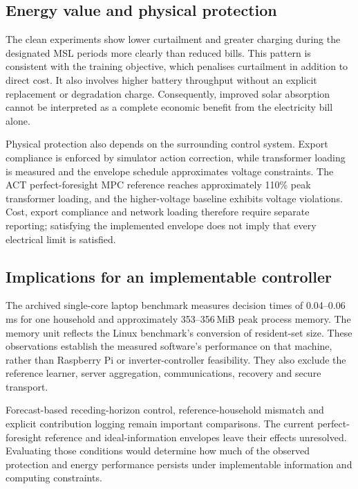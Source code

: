 \subsection{Energy value and physical protection}
The clean experiments show lower curtailment and greater charging during the designated MSL periods more clearly than reduced bills. This pattern is consistent with the training objective, which penalises curtailment in addition to direct cost. It also involves higher battery throughput without an explicit replacement or degradation charge. Consequently, improved solar absorption cannot be interpreted as a complete economic benefit from the electricity bill alone.

Physical protection also depends on the surrounding control system. Export compliance is enforced by simulator action correction, while transformer loading is measured and the envelope schedule approximates voltage constraints. The ACT perfect-foresight MPC reference reaches approximately 110\% peak transformer loading, and the higher-voltage baseline exhibits voltage violations. Cost, export compliance and network loading therefore require separate reporting; satisfying the implemented envelope does not imply that every electrical limit is satisfied.

\subsection{Implications for an implementable controller}
The archived single-core laptop benchmark measures decision times of 0.04--0.06\,ms for one household and approximately 353--356\,MiB peak process memory. The memory unit reflects the Linux benchmark's conversion of resident-set size. These observations establish the measured software's performance on that machine, rather than Raspberry Pi or inverter-controller feasibility. They also exclude the reference learner, server aggregation, communications, recovery and secure transport.

Forecast-based receding-horizon control, reference-household mismatch and explicit contribution logging remain important comparisons. The current perfect-foresight reference and ideal-information envelopes leave their effects unresolved. Evaluating those conditions would determine how much of the observed protection and energy performance persists under implementable information and computing constraints.
